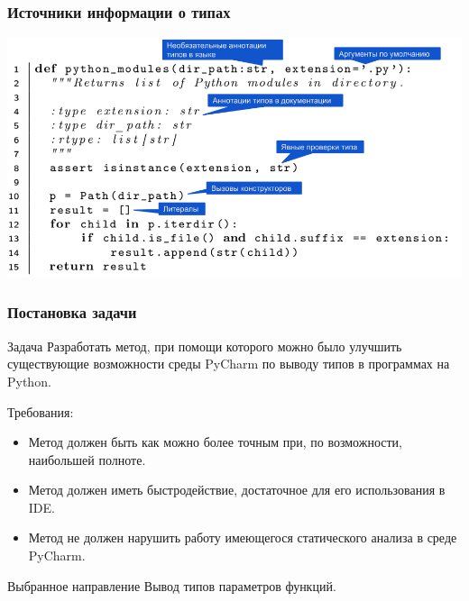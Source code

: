 \documentclass{beamer}
\begin{document}
\begin{frame}[fragile]
  \frametitle{Источники информации о типах}



  \includegraphics[width=0.9\paperwidth]{fig/type-sources-annotated.png}
    
\end{frame}

\begin{frame}
    \frametitle{Постановка задачи}
    \begin{block}{Задача}
        Разработать метод, при помощи которого можно было улучшить существующие
        возможности среды PyCharm по выводу типов в программах на Python.
    \end{block}

    Требования:
    \begin{itemize}
        \item Метод должен быть как можно более точным при, по возможности,
          наибольшей полноте.

        \item Метод должен иметь быстродействие, достаточное для его использования в
          IDE.

        \item Метод не должен нарушить работу имеющегося статического анализа в
          среде PyCharm.
    \end{itemize}
    
    \begin{block}{Выбранное направление}
      Вывод типов параметров функций.
    \end{block}

\end{frame}
\end{document}
